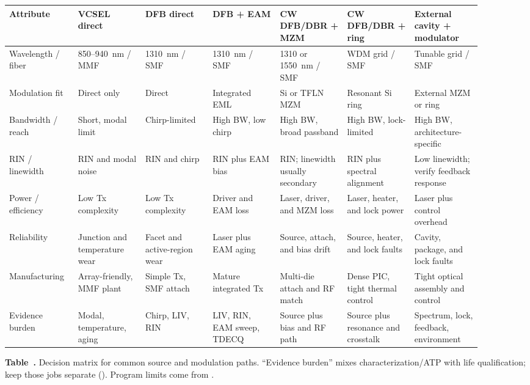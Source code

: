 \begin{table}[ht]
\label{tab:source-mod-matrix}%
\centering
\setlength{\tabcolsep}{2.5pt}%
\scriptsize
\renewcommand{\arraystretch}{1.25}%
\begin{tabular}{@{}p{0.12\linewidth}p{0.13\linewidth}p{0.13\linewidth}p{0.13\linewidth}p{0.13\linewidth}p{0.13\linewidth}p{0.13\linewidth}@{}}
\toprule
Attribute & VCSEL direct & DFB direct & DFB + EAM & CW DFB/DBR + MZM & CW DFB/DBR + ring & External cavity + modulator \\
\midrule
Wavelength / fiber & 850--940~nm / MMF & 1310~nm / SMF & 1310~nm / SMF & 1310 or 1550~nm / SMF & WDM grid / SMF & Tunable grid / SMF \\
\addlinespace[1.5em]
Modulation fit & Direct only & Direct & Integrated EML & Si or TFLN MZM & Resonant Si ring & External MZM or ring \\
\addlinespace[1.5em]
Bandwidth / reach & Short, modal limit & Chirp-limited & High BW, low chirp & High BW, broad passband & High BW, lock-limited & High BW, architecture-specific \\
\addlinespace[1.5em]
RIN / linewidth & RIN and modal noise & RIN and chirp & RIN plus EAM bias & RIN; linewidth usually secondary & RIN plus spectral alignment & Low linewidth; verify feedback response \\
\addlinespace[1.5em]
Power / efficiency & Low Tx complexity & Low Tx complexity & Driver and EAM loss & Laser, driver, and MZM loss & Laser, heater, and lock power & Laser plus control overhead \\
\addlinespace[1.5em]
Reliability & Junction and temperature wear & Facet and active-region wear & Laser plus EAM aging & Source, attach, and bias drift & Source, heater, and lock faults & Cavity, package, and lock faults \\
\addlinespace[1.5em]
Manufacturing & Array-friendly, MMF plant & Simple Tx, SMF attach & Mature integrated Tx & Multi-die attach and RF match & Dense PIC, tight thermal control & Tight optical assembly and control \\
\addlinespace[1.5em]
Evidence burden & Modal, temperature, aging & Chirp, LIV, RIN & LIV, RIN, EAM sweep, TDECQ & Source plus bias and RF path & Source plus resonance and crosstalk & Spectrum, lock, feedback, environment \\
\bottomrule
\end{tabular}
\par\medskip
{\raggedright\footnotesize\textbf{Table~\thetable.} Decision matrix for common
source and modulation paths. ``Evidence burden'' mixes characterization/ATP with
life qualification; keep those jobs separate ().
Program limits come from .\par}
\end{table}
\FloatBarrier

